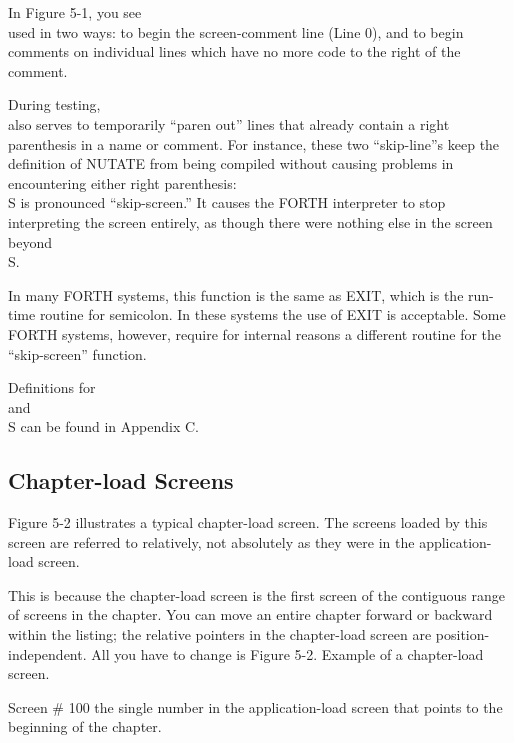 In Figure 5-1, you see \\ used in two ways: to begin the screen-comment
line (Line 0), and to begin comments on individual lines which
have no more code to the right of the comment.

During testing, \\ also serves to temporarily ``paren out'' lines that
already contain a right parenthesis in a name or comment.  For instance,
these two ``skip-line''s keep the definition of NUTATE from being compiled
without causing problems in encountering either right parenthesis:
\\ S is pronounced ``skip-screen.'' It causes the FORTH interpreter to stop
interpreting the screen entirely, as though there were nothing else in the
screen beyond \\S.

In many FORTH systems, this function is the same as EXIT, which
is the run-time routine for semicolon.  In these systems the use of EXIT is
acceptable.  Some FORTH systems, however, require for internal reasons
a different routine for the ``skip-screen'' function.

Definitions for \\ and \\S can be found in Appendix C.

\subsection{Chapter-load Screens}

Figure 5-2 illustrates a typical chapter-load screen.  The screens loaded by
this screen are referred to relatively, not absolutely as they were in the
application-load screen.

This is because the chapter-load screen is the first screen of the contiguous
range of screens in the chapter.  You can move an entire chapter
forward or backward within the listing; the relative pointers in the
chapter-load screen are position-independent.  All you have to change is
Figure 5-2. Example of a chapter-load screen.

Screen \# 100
the single number in the application-load screen that points to the beginning
of the chapter.

